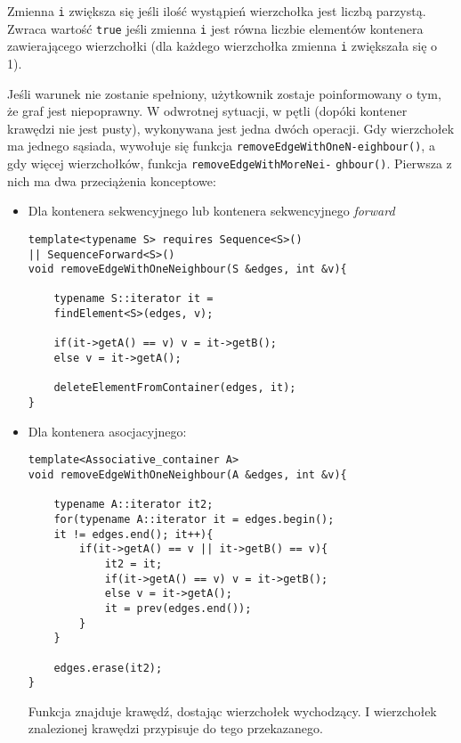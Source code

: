 \documentclass[11pt, a4paper]{article}
\begin{document}
Zmienna \verb#i#  zwiększa się jeśli ilość wystąpień wierzchołka jest liczbą parzystą. Zwraca wartość \verb#true# jeśli zmienna \verb#i# jest równa liczbie elementów kontenera zawierającego wierzchołki (dla każdego wierzchołka zmienna \verb#i# zwiększała się o 1).

Jeśli warunek nie zostanie spełniony, użytkownik zostaje poinformowany o tym, że graf jest niepoprawny. W odwrotnej sytuacji, w pętli (dopóki kontener krawędzi nie jest pusty), wykonywana jest jedna dwóch operacji. Gdy wierzchołek ma jednego sąsiada, wywołuje się funkcja \verb#removeEdgeWithOneN-#\newline \verb#eighbour()#, a gdy więcej wierzchołków, funkcja \verb#removeEdgeWithMoreNei-# \newline \verb#ghbour()#. Pierwsza z nich ma dwa przeciążenia konceptowe:
\begin{itemize}

\item Dla kontenera sekwencyjnego lub kontenera sekwencyjnego \emph{forward}
\begin{lstlisting}[frame=single]
template<typename S> requires Sequence<S>()
|| SequenceForward<S>()
void removeEdgeWithOneNeighbour(S &edges, int &v){
    
    typename S::iterator it = 
    findElement<S>(edges, v);
    
    if(it->getA() == v) v = it->getB();
    else v = it->getA();

    deleteElementFromContainer(edges, it);
}
\end{lstlisting}

\item Dla kontenera asocjacyjnego:
\begin{lstlisting}[frame=single]
template<Associative_container A>
void removeEdgeWithOneNeighbour(A &edges, int &v){
    
    typename A::iterator it2;
    for(typename A::iterator it = edges.begin();
    it != edges.end(); it++){
        if(it->getA() == v || it->getB() == v){
            it2 = it;
            if(it->getA() == v) v = it->getB();
            else v = it->getA();
            it = prev(edges.end());
        }
    }

    edges.erase(it2);
}
\end{lstlisting}

Funkcja znajduje krawędź, dostając wierzchołek wychodzący. I wierzchołek znalezionej krawędzi przypisuje do tego przekazanego.

\end{itemize}
\end{document}
